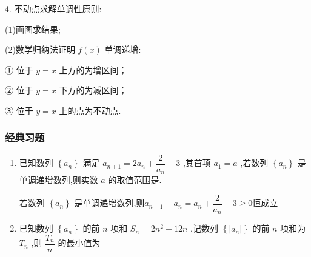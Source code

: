 4. 不动点求解单调性原则:

(1)画图求结果;

(2)数学归纳法证明 $f\left( x\right)$ 单调递增:

① 位于 $y = x$ 上方的为增区间；

② 位于 $y = x$ 下方的为减区间；

③ 位于 $y = x$ 上的点为不动点.

\subsubsection*{经典习题}
\begin{enumerate}
    \item 已知数列 $\left\{  {a}_{n}\right\}$ 满足 ${a}_{n + 1} = 2{a}_{n} + \dfrac{2}{{a}_{n}} - 3$ ,其首项 ${a}_{1} = a$ ,若数列 $\left\{  {a}_{n}\right\}$ 是单调递增数列,则实数 $a$ 的取值范围是\blkda[3]{$\left(0, \dfrac{1}{2}\right] \cup [2, +\infty)$}.
    \begin{jieda}
        若数列 $\left\{  {a}_{n}\right\}$ 是单调递增数列,则$a_{n+1} - a_n = {a}_{n} + \dfrac{2}{{a}_{n}} - 3 \geq 0$恒成立
        \begin{dingautolist}{172}
            \item 若$a \in [2, +\infty)$，满足要求
            \item 若$a \in \left(0, 1\right]$，则$a_2 = 2a+\dfrac{2}{a}-3 \geq 1$，故必有$a_2 = 2a+\dfrac{2}{a}-3 \geq 2$满足要求，解得$a \in \left(0, \dfrac{1}{2}\right]$
        \end{dingautolist}
    \end{jieda}
    \item 已知数列 $\left\{  {a}_{n}\right\}$ 的前 $n$ 项和 ${S}_{n} = 2{n}^{2} - {12n}$ ,记数列 $\left\{  \left| {a}_{n}\right| \right\}$ 的前 $n$ 项和为 ${T}_{n}$ ,则 $\dfrac{{T}_{n}}{n}$ 的最小值为
\end{enumerate}
